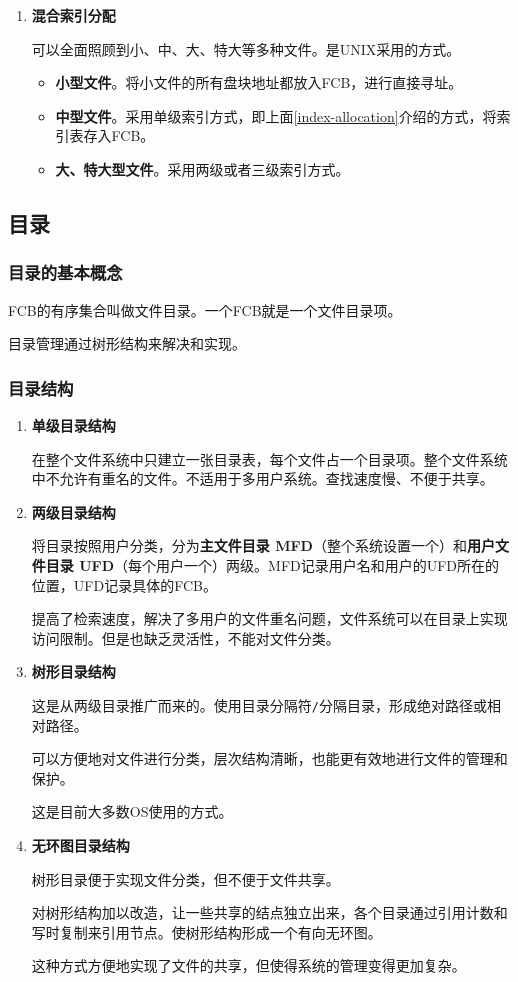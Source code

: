 \documentclass[12pt, a4paper, oneside]{ctexart}
\begin{document}
\begin{enumerate}
  \item {\bf 混合索引分配}
  
  可以全面照顾到小、中、大、特大等多种文件。是UNIX采用的方式。
  \begin{itemize}
    \item {\bf 小型文件}。将小文件的所有盘块地址都放入FCB，进行直接寻址。
    \item {\bf 中型文件}。采用单级索引方式，即上面\ref{index-allocation}介绍的方式，将索引表存入FCB。
    \item {\bf 大、特大型文件}。采用两级或者三级索引方式。
  \end{itemize}
\end{enumerate}

\subsection{目录}

\subsubsection{目录的基本概念}

FCB的有序集合叫做文件目录。一个FCB就是一个文件目录项。

目录管理通过树形结构来解决和实现。

\subsubsection{目录结构}

\begin{enumerate}
  \item {\bf 单级目录结构}
  
  在整个文件系统中只建立一张目录表，每个文件占一个目录项。整个文件系统中不允许有重名的文件。不适用于多用户系统。查找速度慢、不便于共享。

  \item {\bf 两级目录结构}
  
  将目录按照用户分类，分为\textbf{主文件目录 MFD}（整个系统设置一个）和\textbf{用户文件目录 UFD}（每个用户一个）两级。MFD记录用户名和用户的UFD所在的位置，UFD记录具体的FCB。

  提高了检索速度，解决了多用户的文件重名问题，文件系统可以在目录上实现访问限制。但是也缺乏灵活性，不能对文件分类。

  \item {\bf 树形目录结构}
  
  这是从两级目录推广而来的。使用目录分隔符\verb|/|分隔目录，形成绝对路径或相对路径。

  可以方便地对文件进行分类，层次结构清晰，也能更有效地进行文件的管理和保护。

  这是目前大多数OS使用的方式。

  \item {\bf 无环图目录结构}
  
  树形目录便于实现文件分类，但不便于文件共享。
  
  对树形结构加以改造，让一些共享的结点独立出来，各个目录通过引用计数和写时复制来引用节点。使树形结构形成一个有向无环图。

  这种方式方便地实现了文件的共享，但使得系统的管理变得更加复杂。
\end{enumerate}
\end{document}
